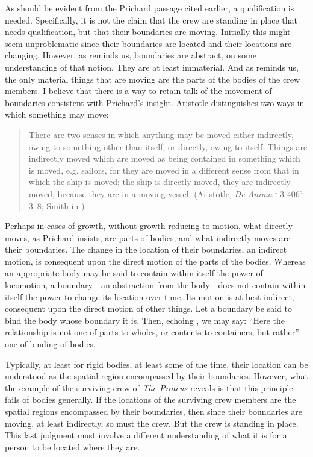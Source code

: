 As should be evident from the Prichard passage cited earlier, a qualification is needed. Specifically, it is not the claim that the crew are standing in place that needs qualification, but that their boundaries are moving. Initially this might seem unproblematic since their boundaries are located and their locations are changing. However, as \citet[103--4]{Derrida:2005aa} reminds us, boundaries are abstract, on some understanding of that notion. They are at least immaterial. And as \citet{Prichard:1950kx} reminds us, the only material things that are moving are the parts of the bodies of the crew members. I believe that there is a way to retain talk of the movement of boundaries consistent with Prichard's insight. Aristotle distinguishes two ways in which something may move: 
\begin{quote}
	There are two senses in which anything may be moved either indirectly, owing to something other than itself, or directly, owing to itself. Things are indirectly moved which are moved as being contained in something which is moved, e.g. sailors, for they are moved in a different sense from that in which the ship is moved; the ship is directly moved, they are indirectly moved, because they are in a moving vessel. (Aristotle, \emph{De Anima} \textsc{i} 3 406\( ^{a} \)3--8; Smith in \citealt[9]{Barnes:1984uq})
\end{quote} 
Perhaps in cases of growth, without growth reducing to motion, what directly moves, as Prichard insists, are parts of bodies, and what indirectly moves are their boundaries. The change in the location of their boundaries, an indirect motion, is consequent upon the direct motion of the parts of the bodies. Whereas an appropriate body may be said to contain within itself the power of locomotion, a boundary---an abstraction from the body---does not contain within itself the power to change its location over time. Its motion is at best indirect, consequent upon the direct motion of other things. Let a boundary be said to bind the body whose boundary it is. Then, echoing \citet[174]{Witt:1995kx}, we may say: ``Here the relationship is not one of parts to wholes, or contents to containers, but rather'' one of binding of bodies.

Typically, at least for rigid bodies, at least some of the time, their location can be understood as the spatial region encompassed by their boundaries. However, what the example of the surviving crew of \emph{The Proteus} reveals is that this principle fails of bodies generally. If the locations of the surviving crew members are the spatial regions encompassed by their boundaries, then since their boundaries are moving, at least indirectly, so must the crew. But the crew is standing in place. This last judgment must involve a different understanding of what it is for a person to be located where they are.

